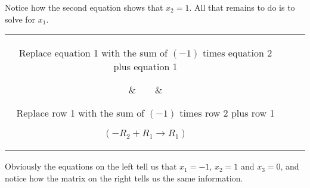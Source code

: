 {Notice how the second equation shows that $x_2 = 1$. All that remains to do is to solve for $x_1$.

\begin{center}
\begin{tabular}{ccc}
\parbox{120pt}{\centering\small Replace equation 1 with the sum of $(-1)$ times equation 2 plus equation 1}
&$\quad \quad$&
\parbox{120pt}{\centering\small Replace row 1 with the sum of $(-1)$ times row 2 plus row 1

$(-R_2+R_1\rightarrow R_1)$}
\\
\\
$\begin{array}{JQJQKQJ}
x_1& &   &&&=&-1\\
   & &x_2&&&=&1\\
   & &   & &x_3&=&0
\end{array}$
&$\quad \quad$&
$\bmx{JJJJ}
1&0&0&-1\\ 0&1&0&1\\ 0&0&1&0\\
\emx$
\end{tabular}
\end{center}

Obviously the equations on the left tell us that $x_1 = -1$, $x_2 = 1$ and $x_3=0$, and notice how the matrix on the right tells us the same information. }\\




